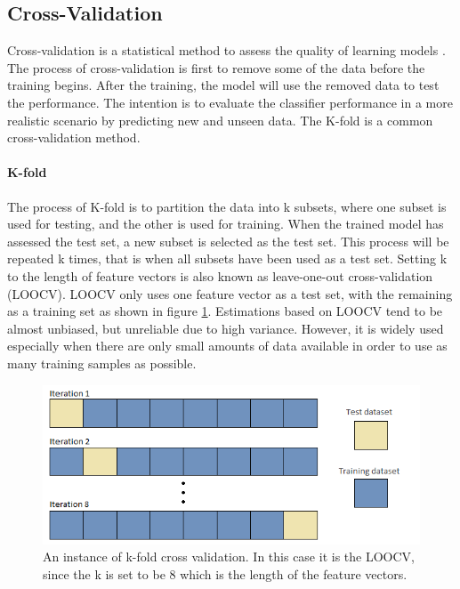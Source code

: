 \documentclass[USenglish]{ifimaster}  %
\begin{document}
\subsection{Cross-Validation} \label{sub:cv}
Cross-validation is a statistical method to assess the quality of learning models \cite{Refaeilzadeh2009}. The process of cross-validation is first to remove some of the data before the training begins. After the training, the model will use the removed data to test the performance. The intention is to evaluate the classifier performance in a more realistic scenario by predicting new and unseen data. The K-fold is a common cross-validation method.
	
\paragraph{K-fold}
The process of K-fold is to partition the data into k subsets, where one subset is used for testing, and the other is used for training. When the trained model has assessed the test set, a new subset is selected as the test set. This process will be repeated k times, that is when all subsets have been used as a test set. Setting k to the length of feature vectors is also known as leave-one-out cross-validation (LOOCV). LOOCV only uses one feature vector as a test set, with the remaining as a training set as shown in figure \ref{fig:kfold}. Estimations based on LOOCV tend to be almost unbiased, but unreliable due to high variance. However, it is widely used especially when there are only small amounts of data available in order to use as many training samples as possible.


 	
	\begin{figure}[h]
		\centering
		\includegraphics[scale=0.6]{Figures/Kfold}
		\caption[K-fold cross validation]{An instance of k-fold cross validation. In this case it is the LOOCV, since the k is set to be 8 which is the length of the feature vectors.}
		\label{fig:kfold}
	\end{figure}
	
\end{document}
